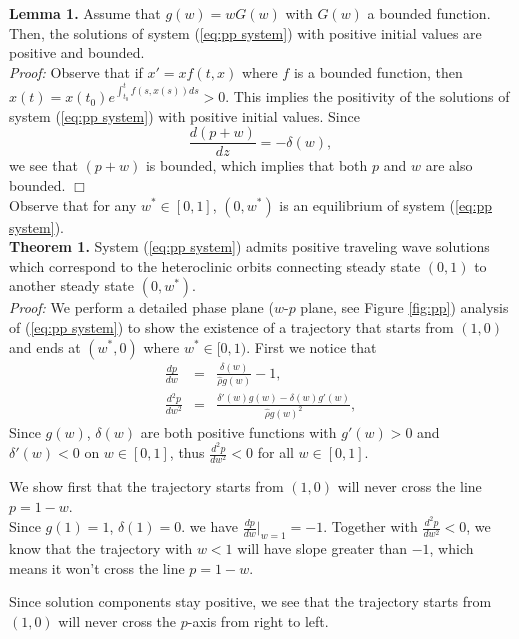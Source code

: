 \documentclass{aims}
\numberwithin{equation}{section}
\begin{document}
\noindent
\textbf{Lemma 1.} Assume that $g(w)=wG(w)$ with $G(w)$ a bounded function. Then, the solutions of system (\ref{eq:pp system}) with positive initial values are positive and bounded. \\
\emph{Proof:} Observe that if $x'=xf(t, x)$ where $f$ is a bounded function, then $x(t)=x(t_0)e^{\int^t_{t_0} f(s, x(s))ds}>0.$
This implies the positivity of the solutions of system (\ref{eq:pp system}) with positive initial values.
Since
\begin{equation}
\frac{d(p+w)}{dz}=-\delta(w),
\end{equation}
we see that $(p+w)$ is bounded, which implies that both $p$ and $w$ are also bounded. $\Box$ \\

Observe that for any $w^*\in [0,1]$, $(0, w^*)$ is an equilibrium of system (\ref{eq:pp system}). \\

\noindent
\textbf{Theorem 1.}  System (\ref{eq:pp system}) admits positive traveling wave solutions which correspond to the heteroclinic orbits connecting steady state $(0, 1)$ to another steady state $(0, w^*)$. \\
\emph{Proof:} We perform a detailed phase plane ($w$-$p$ plane, see Figure \ref{fig:pp}) analysis of (\ref{eq:pp system})
to show the existence of a trajectory that starts from $(1,0)$ and ends at $(w^{*},0)$ where $w^*\in [0,1)$.
First we notice that 
\begin{eqnarray}
\frac{dp}{dw} & = & \frac{\delta(w)}{\hat{\rho}g(w)}-1 , \\
\frac{d^{2}p}{dw^{2}} & = & \frac{\delta'(w)g(w)-\delta(w)g'(w)}{\hat{\rho} g(w)^{2}},
\end{eqnarray}
Since $g(w)$, $\delta(w)$ are both positive functions with $g'(w)>0$ and $\delta'(w)<0$ on $w\in [0,1]$, thus $\frac{d^{2}p}{dw^{2}}<0$ for all $w\in [0,1]$. 

We show first that the trajectory starts from $(1,0)$ will never cross the line $p=1-w$. \\
Since $g(1)=1$, $\delta(1)=0$. we have $\frac{dp}{dw}\vert_{w=1}=-1$. Together with $\frac{d^{2}p}{dw^{2}}<0$, we know that the trajectory with $w<1$ will have slope greater than $-1$, which means it won't cross the line $p=1-w$.

Since solution components stay positive, we see that the trajectory starts from $(1,0)$ will never cross the $p$-axis from right to left. 
\end{document}
